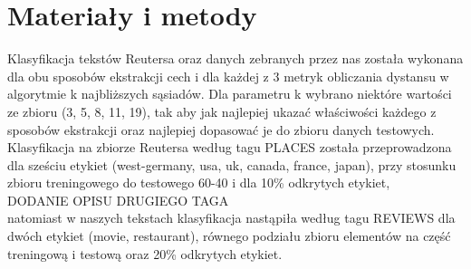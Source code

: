 \documentclass{classrep}
\begin{document}
\section{Materiały i metody}
Klasyfikacja tekstów Reutersa oraz danych zebranych przez nas została wykonana dla obu sposobów ekstrakcji cech i dla każdej z 3 metryk obliczania dystansu w algorytmie k najbliższych sąsiadów. Dla parametru k wybrano niektóre wartości ze zbioru (3, 5, 8, 11, 19), tak aby jak najlepiej ukazać właściwości każdego z sposobów ekstrakcji oraz najlepiej dopasować je do zbioru danych testowych. Klasyfikacja na zbiorze Reutersa według tagu PLACES została przeprowadzona dla sześciu etykiet (west-germany, usa, uk, canada, france, japan), przy stosunku zbioru treningowego do testowego 60-40 i dla 10\% odkrytych etykiet,\\
DODANIE OPISU DRUGIEGO TAGA\\
natomiast w naszych tekstach klasyfikacja nastąpiła według tagu REVIEWS dla dwóch etykiet (movie, restaurant), równego podziału zbioru elementów na część treningową i testową oraz 20\% odkrytych etykiet.
\end{document}
